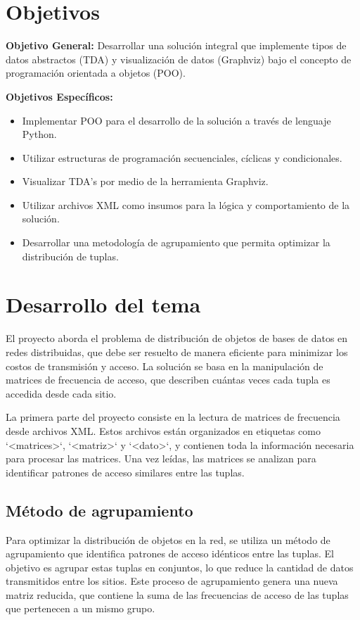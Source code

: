 \documentclass[letterpaper,12pt]{article}
\begin{document}
\begin{multicols}{2}
    \section*{Objetivos}
    \textbf{Objetivo General:}
    Desarrollar una solución integral que implemente tipos de datos abstractos (TDA) y visualización de datos (Graphviz) bajo el concepto de programación orientada a objetos (POO).

    \textbf{Objetivos Específicos:}
    \begin{itemize}
        \item Implementar POO para el desarrollo de la solución a través de lenguaje Python.
        \item Utilizar estructuras de programación secuenciales, cíclicas y condicionales.
        \item Visualizar TDA's por medio de la herramienta Graphviz.
        \item Utilizar archivos XML como insumos para la lógica y comportamiento de la solución.
        \item Desarrollar una metodología de agrupamiento que permita optimizar la distribución de tuplas.
    \end{itemize}

    \section*{Desarrollo del tema}
    El proyecto aborda el problema de distribución de objetos de bases de datos en redes distribuidas, que debe ser resuelto de manera eficiente para minimizar los costos de transmisión y acceso. La solución se basa en la manipulación de matrices de frecuencia de acceso, que describen cuántas veces cada tupla es accedida desde cada sitio.

    La primera parte del proyecto consiste en la lectura de matrices de frecuencia desde archivos XML. Estos archivos están organizados en etiquetas como `<matrices>`, `<matriz>` y `<dato>`, y contienen toda la información necesaria para procesar las matrices. Una vez leídas, las matrices se analizan para identificar patrones de acceso similares entre las tuplas.

    \subsection*{Método de agrupamiento}
    Para optimizar la distribución de objetos en la red, se utiliza un método de agrupamiento que identifica patrones de acceso idénticos entre las tuplas. El objetivo es agrupar estas tuplas en conjuntos, lo que reduce la cantidad de datos transmitidos entre los sitios. Este proceso de agrupamiento genera una nueva matriz reducida, que contiene la suma de las frecuencias de acceso de las tuplas que pertenecen a un mismo grupo.


\end{multicols}
\end{document}
